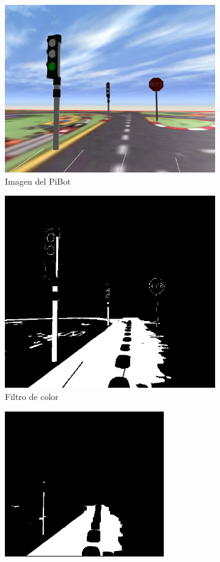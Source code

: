\documentclass{report}
\begin{document}
\begin{figure}[h]
\begin{subfigure}{.5\textwidth}
  \centering
  \includegraphics[width=.7\linewidth, height=.65\linewidth]{images/cap4/camara-pibot.png}  
  \caption{Imagen del PiBot}
  \label{fig:sub-first}
\end{subfigure}
\begin{subfigure}{.5\textwidth}
  \centering
  \includegraphics[width=.7\linewidth]{images/cap4/filtro-color.png}  
  \caption{Filtro de color}
  \label{fig:sub-second}
\end{subfigure}
\begin{subfigure}{.5\textwidth}
  \centering
  \includegraphics[width=.7\linewidth]{images/cap4/erosion-dilatacion.png}  

\end{subfigure}
\end{figure}
\end{document}
